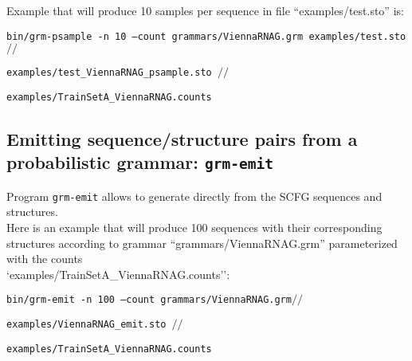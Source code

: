 \noindent
Example that will produce 10 samples per sequence in file ``examples/test.sto'' is:\\

\begin{footnotesize}
\texttt{bin/grm-psample -n 10 --count grammars/ViennaRNAG.grm examples/test.sto $//$}

\hspace{15mm}\texttt{examples/test\_ViennaRNAG\_psample.sto $//$}

\hspace{15mm}\texttt{examples/TrainSetA\_ViennaRNAG.counts}\\
\end{footnotesize}


\subsection{Emitting sequence/structure pairs from a probabilistic grammar: \texttt{grm-emit}}
Program \texttt{grm-emit} allows to generate directly from the SCFG sequences and structures. \\

\noindent
Here is an example that will produce 100 sequences with their
corresponding structures according to grammar
``grammars/ViennaRNAG.grm'' parameterized with the
counts\\ `examples/TrainSetA\_ViennaRNAG.counts'':\\

\begin{footnotesize}
  \texttt{bin/grm-emit -n 100 --count grammars/ViennaRNAG.grm$//$}
  
  \hspace{15mm}\texttt{examples/ViennaRNAG\_emit.sto $//$}

  \hspace{15mm}\texttt{examples/TrainSetA\_ViennaRNAG.counts}\\
\end{footnotesize}
